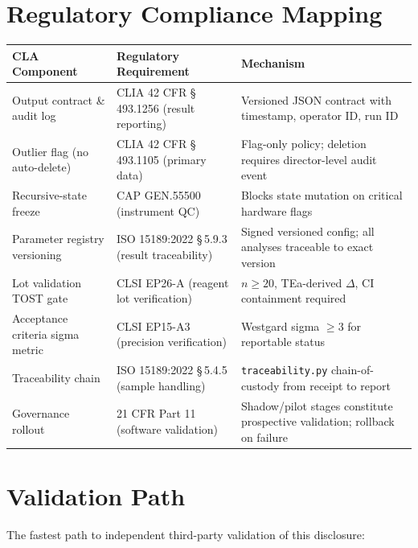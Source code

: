 \documentclass[11pt,a4paper]{article}
\begin{document}
\section{Regulatory Compliance Mapping}
\label{sec:regulatory}

\begin{longtable}{@{}p{4.5cm}p{4.5cm}p{5cm}@{}}
\toprule
\textbf{CLA Component} & \textbf{Regulatory Requirement} & \textbf{Mechanism} \\
\midrule
Output contract \& audit log
  & CLIA 42 CFR \S\,493.1256 (result reporting)
  & Versioned JSON contract with timestamp, operator ID, run ID \\[4pt]
Outlier flag (no auto-delete)
  & CLIA 42 CFR \S\,493.1105 (primary data)
  & Flag-only policy; deletion requires director-level audit event \\[4pt]
Recursive-state freeze
  & CAP GEN.55500 (instrument QC)
  & Blocks state mutation on critical hardware flags \\[4pt]
Parameter registry versioning
  & ISO 15189:2022 \S\,5.9.3 (result traceability)
  & Signed versioned config; all analyses traceable to exact version \\[4pt]
Lot validation TOST gate
  & CLSI EP26-A (reagent lot verification)
  & $n \ge 20$, TEa-derived $\Delta$, CI containment required \\[4pt]
Acceptance criteria sigma metric
  & CLSI EP15-A3 (precision verification)
  & Westgard sigma $\ge 3$ for reportable status \\[4pt]
Traceability chain
  & ISO 15189:2022 \S\,5.4.5 (sample handling)
  & \texttt{traceability.py} chain-of-custody from receipt to report \\[4pt]
Governance rollout
  & 21 CFR Part 11 (software validation)
  & Shadow/pilot stages constitute prospective validation; rollback on failure \\
\bottomrule
\end{longtable}

\section{Validation Path}
\label{sec:validation}

The fastest path to independent third-party validation of this disclosure:
\end{document}
